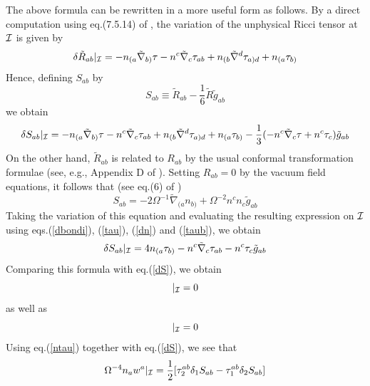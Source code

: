 The above formula can be rewritten in a more useful form as
follows. By a direct computation using eq.(7.5.14) of \cite{w}, the
variation of the unphysical Ricci tensor at ${\cal I}$ is given by
\begin{equation}
\delta \tilde{R}_{ab} |_{\cal I} = - n_{(a} \tilde{\nabla}_{b)} \tau
- n^c \tilde{\nabla}_c \tau_{ab} + n_{(b} \tilde{\nabla}^d \tau_{a)d}
+ n_{(a} \tau_{b)}
\label{dR}
\end{equation}
Hence, defining $S_{ab}$ by
\begin{equation}
S_{ab} \equiv \tilde{R}_{ab} - \frac{1}{6} \tilde{R} \tilde{g}_{ab}
\label{S}
\end{equation}
we obtain
\begin{equation}
\delta S_{ab} |_{\cal I} =  - n_{(a} \tilde{\nabla}_{b)} \tau
- n^c \tilde{\nabla}_c \tau_{ab} + n_{(b}
\tilde{\nabla}^d \tau_{a)d} + n_{(a} \tau_{b)}
- \frac{1}{3} (-n^c \tilde{\nabla}_c \tau
+ n^c \tau_c) \tilde{g}_{ab}
\label{dS}
\end{equation}
On the other hand, $\tilde{R}_{ab}$ is related to $R_{ab}$ by the
usual conformal transformation formulae (see, e.g., Appendix D of
\cite{w}). Setting $R_{ab} = 0$ by the vacuum field equations, it
follows that (see eq.(6) of \cite{g})
\begin{equation}
S_{ab} = - 2 \Omega^{-1} \tilde{\nabla}_{(a} n_{b)} + \Omega^{-2} n^c
n_c \tilde{g}_{ab}
\label{Sconf}
\end{equation}
Taking the variation of this equation and evaluating the resulting
expression on $\cal I$ using eqs.(\ref{dbondi}), (\ref{tau}),
(\ref{dn}) and (\ref{taub}), we obtain
\begin{equation}
\delta S_{ab}|_{\cal I} = 4n_{(a} \tau_{b)} - n^c \tilde{\nabla}_c
\tau_{ab} - n^c \tau_c \tilde{g}_{ab}
\label{dSconf}
\end{equation}
Comparing this formula with eq.(\ref{dS}), we obtain
\begin{equation}
[\tilde{\nabla}^b \tau_{ab} - \tilde{\nabla}_a \tau - 3 \tau_a]
|_{\cal I} = 0
\label{ntau0}
\end{equation}
as well as
\begin{equation}
[n^b \tilde{\nabla}_b \tau + 2 n^b \tau_b] |_{\cal I} = 0
\label{ntau}
\end{equation}
Using eq.(\ref{ntau}) together with eq.(\ref{dS}), we see that
\begin{equation}
\Omega^{-4} n_a w^a|_{\cal I} = \frac{1}{2} [\tau_{2}^{ab} \delta_1
S_{ab} -\tau_{1}^{ab} \delta_2 S_{ab}]
\label{omegascri2}
\end{equation}
